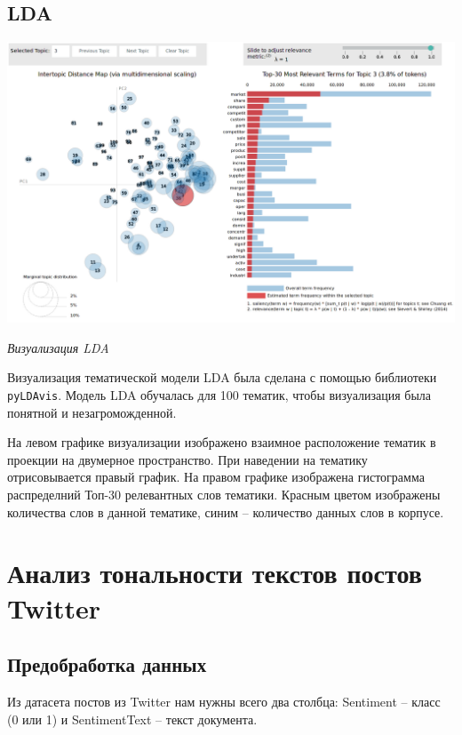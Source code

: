 \documentclass[12pt, a4paper]{article}
\begin{document}
        \subsection{LDA}
            \begin{singlespace}
                \begin{center}
                    \includegraphics[width=17cm]{lda.png}

                    \textit{Визуализация LDA}
                \end{center}
            \end{singlespace}

            Визуализация тематической модели LDA была сделана с помощью библиотеки \verb|pyLDAvis|. Модель LDA обучалась для 100 тематик, чтобы визуализация была понятной и незагроможденной.

            На левом графике визуализации изображено взаимное расположение тематик в проекции на двумерное пространство. При наведении на тематику отрисовывается правый график. На правом графике изображена гистограмма распределний Топ-30 релевантных слов тематики. Красным цветом изображены количества слов в данной тематике, синим -- количество данных слов в корпусе.

    \section{Анализ тональности текстов постов Twitter}
        \subsection{Предобработка данных}
            Из датасета постов из Twitter нам нужны всего два столбца: Sentiment -- класс (0 или 1) и SentimentText -- текст документа.
\end{document}
